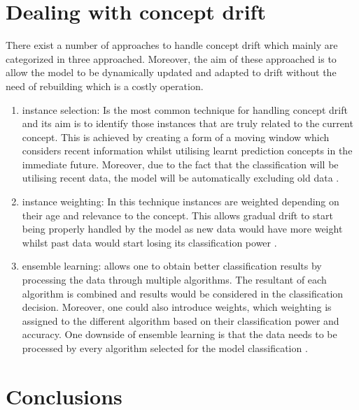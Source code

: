 \section{Dealing with concept drift}
There exist a number of approaches to handle concept drift which mainly are categorized in three approached. Moreover, the aim of these approached is to allow the model to be dynamically updated and adapted to drift without the need of rebuilding which is a costly operation. 
   \begin{enumerate}
  \item	instance selection: Is the most common technique for handling concept drift and its aim is to identify those instances that are truly related to the current concept. This is achieved by creating a form of a moving window which considers recent information whilst utilising learnt prediction concepts in the immediate future. Moreover, due to the fact that the classification will be utilising recent data, the model will be automatically excluding old data \citep{Webb:2016:CCD:2962863.2962874}.

 \item instance weighting: In this technique instances are weighted depending on their age and relevance to the concept. This allows gradual drift to start being properly handled by the model as new data would have more weight whilst past data would start losing its classification power \citep{Webb:2016:CCD:2962863.2962874}. 

 \item	ensemble learning: allows one to obtain better classification results by processing the data through multiple algorithms. The resultant of each algorithm is combined and results would be considered in the classification decision. Moreover, one could also introduce weights, which weighting is assigned to the different algorithm based on their classification power and accuracy. One downside of ensemble learning is that the data needs to be processed by every algorithm selected for the model classification \citep{Webb:2016:CCD:2962863.2962874}. 
 
 \end{enumerate}
  
\section{Conclusions}

